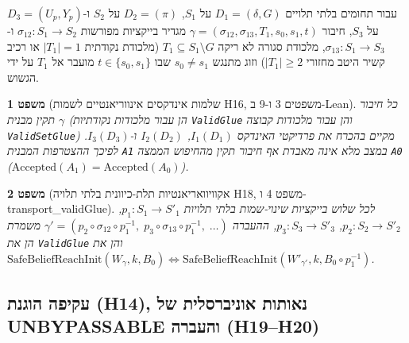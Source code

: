 \documentclass[10pt,a4paper]{article}
\newcommand{\code}[1]{\foreignlanguage{english}{\nolinkurl{#1}}}
\newtheorem{theorem}{משפט}[section]
\begin{document}
עבור תחומים בלתי תלויים $D_1 = (\delta, G)$ על $S_1$, $D_2 = (\pi)$ על $S_2$ ו-$D_3 = (U_p, Y_p)$ על $S_3$, חיבור $\gamma = (\sigma_{12}, \sigma_{13}, T_1, s_0, s_1, t)$ מגדיר בייקציות מפורשות $\sigma_{12}: S_1 \to S_2$ ו-$\sigma_{13}: S_1 \to S_3$, מלכודת סגורה לא ריקה $T_1 \subseteq S_1 \setminus G$ (מלכודת נקודתית $|T_1|=1$ או רכיב קשיר היטב מחזורי $|T_1| \ge 2$) וזוג מתנגש $s_0 \ne s_1$ שבו $t \in \{s_0, s_1\}$ מועבר אל $T_1$ על ידי הגשוש.

\begin{theorem}[שלמות אינדקסים אינווריאנטיים לשמות H16, משפטים 3 ו-9 ב-Lean]\label{thm:h16}
כל חיבור תקין מבנית $\gamma$ (הן עבור מלכודות נקודתיות \code{ValidGlue} והן עבור מלכודות קבוצה \code{ValidSetGlue}) מקיים בהכרח את פרדיקטי האינדקס $I_1(D_1)$, $I_2(D_2)$ ו-$I_3(D_3)$. לפיכך ההצטרפות המבנית \code{A1} במצב מלא אינה מאבדת אף חיבור תקין מהחיפוש הממצה \code{A0} ($\mathrm{Accepted}(A_1) = \mathrm{Accepted}(A_0)$).
\end{theorem}

\begin{theorem}[אקוויוואריאנטיות תלת-כיוונית בלתי תלויה H18, משפט 4 ו-transport\_validGlue]\label{thm:h18}
לכל שלוש בייקציות שינוי-שמות \emph{בלתי תלויות} $p_1: S_1 \to S'_1$, $p_2: S_2 \to S'_2$, $p_3: S_3 \to S'_3$, ההעברה $\gamma' = (p_2 \circ \sigma_{12} \circ p_1^{-1},\; p_3 \circ \sigma_{13} \circ p_1^{-1},\; \dots)$ משמרת הן את \code{ValidGlue} והן את $\mathrm{SafeBeliefReachInit}(W_\gamma, k, B_0) \iff \mathrm{SafeBeliefReachInit}(W'_{\gamma'}, k, B_0 \circ p_1^{-1})$.
\end{theorem}

\subsection{עקיפה הוגנת (H14), נאותות אוניברסלית של UNBYPASSABLE והעברה (H19--H20)}
\end{document}
